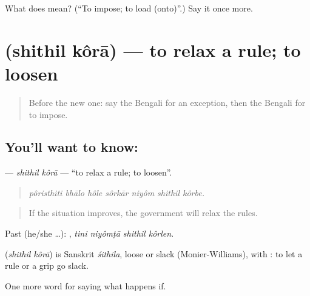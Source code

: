 \begin{tcolorbox}[breakable,colback=teal!4,colframe=teal!35!black,title={Before you move on}]
What does  mean? (\textquotedblleft{}To impose; to load (onto)\textquotedblright{}.) Say it once more.
\end{tcolorbox}
\section[\texorpdfstring{\bn{শিথিল} \bn{করা} (shithil kôrā)}{শিথিল করা (shithil kôrā)}]{  (shithil kôrā) — to relax a rule; to loosen}

\label{lesson:BN-C375-shithil-kora}



\begin{quote}
Before the new one: say the Bengali for an exception, then the Bengali for to impose.
\end{quote}

\subsection*{You'll want to know:  }
\textbf{ } — \emph{shithil kôrā} — \textquotedblleft{}to relax a rule; to loosen\textquotedblright{}.

\begin{quote}
      
\end{quote}

\begin{quote}
\emph{pôristhiti bhālo hôle sôrkār niyôm shithil kôrbe.}
\end{quote}

\begin{quote}
If the situation improves, the government will relax the rules.
\end{quote}

Past (he/she …):    , \emph{tini niyômṭā shithil kôrlen}.

\begin{cousinweb}
\textbf{ } (\emph{shithil kôrā}) is Sanskrit \emph{śithila}, loose or slack (Monier-Williams), with : to let a rule or a grip go slack.
\end{cousinweb}

\begin{grammarlens}[title={What you've built}]
One more word for saying what happens if.
\end{grammarlens}


